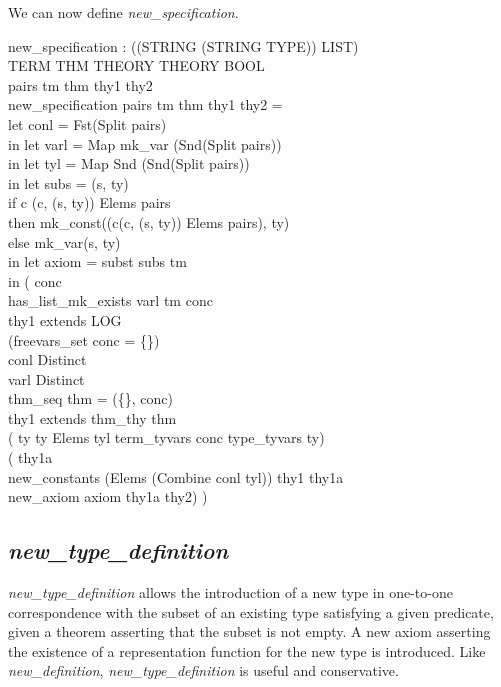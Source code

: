 \documentclass[a4paper,11pt,titlepage]{article}
\begin{document}
\begin{titlepage}
We can now define {\it new\_specification}.
\begin{HOLConst}
\+	\PrNL{}new\_specification\PrNN{} : ((STRING \MMM{\times} (STRING \MMM{\times} TYPE)) LIST) \MMM{\rightarrow}\\
\+	TERM \MMM{\rightarrow} THM \MMM{\rightarrow} THEORY \MMM{\rightarrow} THEORY \MMM{\rightarrow} BOOL\\
\PrPH{}
\+	\MMM{\forall} pairs tm thm thy1 thy2 \MMM{\bullet}\\
\+	new\_specification pairs tm thm thy1 thy2 =\\
\+	let conl = Fst(Split pairs)\\
\+	in let varl = Map mk\_var (Snd(Split pairs))\\
\+	in let tyl = Map Snd (Snd(Split pairs))\\
\+	in let subs = \MMM{\lambda}(s, ty) \MMM{\bullet}\\
\+		if	\MMM{\exists} c \MMM{\bullet} (c, (s, ty)) \MMM{\in} Elems pairs\\
\+		then	mk\_const((\MMM{\epsilon}c\MMM{\bullet}(c, (s, ty)) \MMM{\in} Elems pairs), ty)\\
\+		else 	mk\_var(s, ty)\\
\+	in let axiom = subst subs tm\\
\+	in (\MMM{\exists} conc\MMM{\bullet}\\
\+	has\_list\_mk\_exists varl tm conc\\
\+	\MMM{\land} thy1 extends LOG\\
\+	\MMM{\land} (freevars\_set conc = \{\})\\
\+	\MMM{\land} conl \MMM{\in} Distinct\\
\+	\MMM{\land} varl \MMM{\in} Distinct\\
\+	\MMM{\land} thm\_seq thm = (\{\}, conc)\\
\+	\MMM{\land} thy1 extends thm\_thy thm\\
\+	\MMM{\land} (\MMM{\forall} ty\MMM{\bullet} ty \MMM{\in} Elems tyl \MMM{\Rightarrow} term\_tyvars conc \MMM{\subseteq} type\_tyvars ty)\\
\+	\MMM{\land} (\MMM{\exists} thy1a \MMM{\bullet}\\
\+		new\_constants (Elems (Combine conl tyl)) thy1 thy1a \MMM{\land}\\
\+		new\_axiom axiom thy1a thy2) )\\
\end{HOLConst}

\subsection{{\it new\_type\_definition}}
{\it new\_type\_definition} allows the introduction
of a new type in one-to-one correspondence with
the subset of an existing type satisfying a given
predicate, given a theorem asserting that the subset
is not empty. A new axiom asserting the existence
of a representation function for the new type is introduced.
Like {\it new\_definition}, {\it new\_type\_definition}
is useful and conservative.


\end{titlepage}
\end{document}
